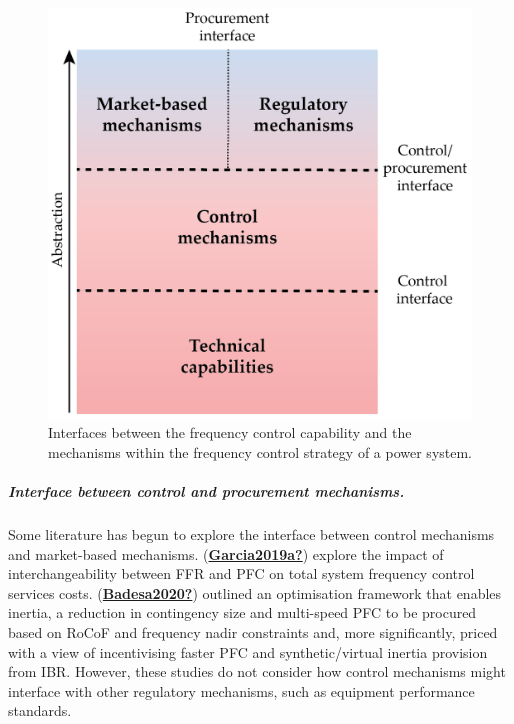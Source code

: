 \documentclass[12pt,a4paper,]{report}
\begin{document}
\begin{figure}
\hypertarget{fig:interfaces}{%
\centering
\includegraphics{source/figures/interfaces_03.png}
\caption{Interfaces between the frequency control capability and the
mechanisms within the frequency control strategy of a power
system.}\label{fig:interfaces}
}
\end{figure}

\hypertarget{interface-between-control-and-procurement-mechanisms.}{%
\subparagraph{Interface between control and procurement
mechanisms.}\label{interface-between-control-and-procurement-mechanisms.}}

Some literature has begun to explore the interface between control
mechanisms and market-based mechanisms.
(\protect\hyperlink{ref-Garcia2019a}{\textbf{Garcia2019a?}}) explore the
impact of interchangeability between FFR and PFC on total system
frequency control services costs.
(\protect\hyperlink{ref-Badesa2020}{\textbf{Badesa2020?}}) outlined an
optimisation framework that enables inertia, a reduction in contingency
size and multi-speed PFC to be procured based on RoCoF and frequency
nadir constraints and, more significantly, priced with a view of
incentivising faster PFC and synthetic/virtual inertia provision from
IBR. However, these studies do not consider how control mechanisms might
interface with other regulatory mechanisms, such as equipment
performance standards.
\end{document}
